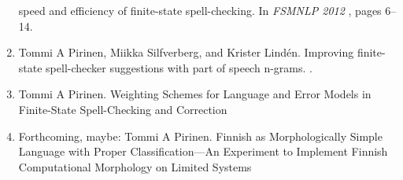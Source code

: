 \documentclass[officiallayout,draft]{unihelcompling}
\begin{document}
\begin{enumerate}
        speed and efficiency of finite-state spell-checking.
        \newblock In {\em FSMNLP 2012\/} \cite{fsmnlp2012}, pages 6--14.
    \item \cite{pirinen2012improving}
        Tommi A Pirinen, Miikka Silfverberg, and Krister Lind\'{e}n.
        \newblock Improving finite-state spell-checker suggestions with part of
        speech n-grams.
        .
    \item \cite{pirinen2013quality}
        Tommi A Pirinen.
        \newblock Weighting Schemes for Language and Error Models in
        Finite-State Spell-Checking and Correction
    \item Forthcoming, maybe:
        Tommi A Pirinen.
        \newblock Finnish as Morphologically Simple Language with Proper
        Classification---An Experiment to Implement Finnish Computational
        Morphology on Limited Systems
\end{enumerate}
\end{document}
